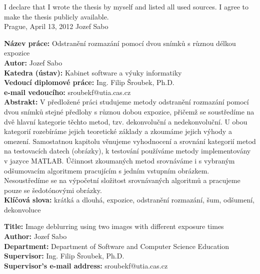 \documentclass[12pt,notitlepage]{report}
\begin{document}
\noindent I declare that I wrote the thesis by myself and listed all used sources. I agree to make the thesis publicly available. \\[2cm]

\noindent Prague, April 13, 2012 \hspace{\fill}Jozef Sabo\\ %


\tableofcontents %
\listoffigures
\listoftables

\newpage %

\noindent
\textbf{Název práce:} Odstranění rozmazání pomocí dvou snímků s různou délkou expozice\\
\textbf{Autor:} Jozef Sabo\\
\textbf{Katedra (ústav):} Kabinet software a výuky informatiky\\
\textbf{Vedoucí diplomové práce:} Ing. Filip Šroubek, Ph.D.\\
\textbf{e-mail vedoucího:} sroubekf@utia.cas.cz\\

\noindent \textbf{Abstrakt:} V předložené práci studujeme metody odstranění rozmazání pomocí dvou snímků stejné předlohy s různou dobou expozice, přičemž se soustředíme na dvě hlavní kategorie těchto metod, tzv. dekonvoluční a nedekonvoluční. U obou kategorií rozebíráme jejich teoretické základy a zkoumáme jejich výhody a omezení. Samostatnou kapitolu věnujeme vyhodnocení a srovnání kategorií metod na testovacích datech (obrázky), k testování používáme metody implementovány v jazyce MATLAB. Účinnost zkoumaných metod srovnáváme i s vybraným odšumovacím algoritmem pracujícím s jedním vstupním obrázkem. Nesoustředíme se na výpočetní složitost srovnávaných algoritmů a pracujeme pouze se šedotónovými obrázky.\\

\noindent \textbf{Klíčová slova:} krátká a dlouhá, expozice, odstranění rozmazání, šum,  odšumení, dekonvoluce

\clearpage

\noindent
\textbf{Title:} Image deblurring using two images with different exposure times\\
\textbf{Author:} Jozef Sabo\\
\textbf{Department:} Department of Software and Computer Science Education\\
\textbf{Supervisor:} Ing. Filip Šroubek, Ph.D.\\
\textbf{Supervisor's e-mail address:} sroubekf@utia.cas.cz\\
\end{document}

